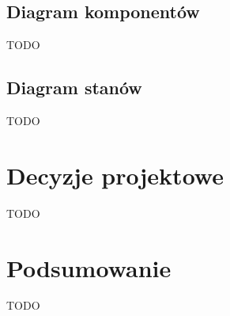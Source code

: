 \documentclass[a4paper,11pt]{article}
\begin{document}
\subsection{Diagram komponentów}
TODO

\subsection{Diagram stanów}
TODO

\section{Decyzje projektowe}
TODO

\section{Podsumowanie}
TODO
\end{document}
